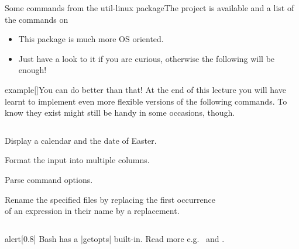 \begin{frame}{Some commands from the util-linux package}{The project is available  and a list of the commands on }
    \vspace{-1mm}
    \begin{itemize}
        \item This package is much more OS oriented.
        \item Just have a look to it if you are curious, otherwise the following will be enough!
    \end{itemize}
    \vspace{-1mm}
    \begin{varblock}{example}[\textwidth]{You can do better than that!}
        At the end of this lecture you will have learnt to implement even more flexible versions of the following commands.
        To know they exist might still be handy in some occasions, though.
    \end{varblock}
    \vspace{-5mm}
    \begin{columns}
        \begin{column}{\dimexpr\paperwidth-10mm}
            \small
            \begin{description}
                \setlength{\itemsep}{1mm}
                \item[\PB{\texttt{cal}}]
                    Display a calendar and the date of Easter.
                \item[\PB{\texttt{column}}]
                    Format the input into multiple columns.
                \item[\PB{\texttt{getopt}}]
                    Parse command options.
                \item[\PB{\texttt{rename}}]
                    Rename the specified files by replacing the first occurrence\\ of an expression in their name by a replacement.
            \end{description}
        \end{column}
    \end{columns}
    \PrepareURLsymbol[PB]
    \begin{varblock}{alert}[0.8\textwidth]{}
        \alert{Bash has a \bash|getopts| built-in. Read more e.g.\  and .}
    \end{varblock}
\end{frame}
